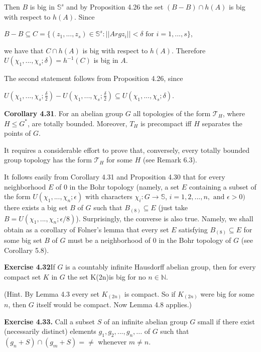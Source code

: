 \documentclass[12pt]{article}
\begin{document}
    Then $B$ is big in $\mathbb{S}^s$ and by Proposition 4.26 the set $(B - B) \cap h(A)$ is big with respect to $h(A)$. Since

        $B - B \subseteq C = \{(z_1, . . . , z_s) \in \mathbb{S}^s: ||Arg z_i|| < \delta \text{ for } i = 1, . . . , s\}$,

    we have that $C \cap h(A)$ is big with respect to $h(A)$. Therefore $U(\chi_1, . . . , \chi_s; \delta) = h^{-1}(C)$ is big in $A$.
        
    
    The second statement follows from Proposition 4.26, since

        $U(\chi_1, ..., \chi_s; \frac{\delta}{2}) - U(\chi_1, ..., \chi_s; \frac{\delta}{2}) \subseteq U(\chi_1, ..., \chi_s; \delta)$.


\textbf{Corollary 4.31}. For an abelian group $G$ all topologies of the form $\mathcal{T}_H$, where $H \leq G^*$, are totally bounded.
Moreover, $T_H$ is precompact iff $H$ separates the points of $G$.


    It requires a considerable effort to prove that, conversely, every totally bounded group topology has the form
$\mathcal{T}_H$ for some $H$ (see Remark 6.3).


    It follows easily from Corollary 4.31 and Proposition 4.30 that for every neighborhood $E$ of 0 in the Bohr
topology (namely, a set $E$ containing a subset of the form $U(\chi_1, . . . , \chi_n; \epsilon)$ with characters $\chi_i: G \to \mathbb{S}$,
$i = 1, 2, . . . , n, \text{ and } \epsilon > 0)$ there exists a big set $B$ of $G$ such that $B_{(8)} \subseteq E$ (just take $B = U(\chi_1, . . . , \chi_n; \epsilon/8)$).
Surprisingly, the converse is also true. Namely, we shall obtain as a corollary of Folner's lemma that every set
$E$ satisfying $B_{(8)} \subseteq E$ for some big set $B$ of $G$ must be a neighborhood of 0 in the Bohr topology of $G$ (see
Corollary 5.8).


\textbf{Exercise 4.32}If $G$ is a countably infinite Hausdorff abelian group, then for every compact set $K$ in $G$ the set
K(2n)is big for no $n \in \mathbb{N}$.


    (Hint. By Lemma 4.3 every set $K_{(2n)}$ is compact. So if $K_{(2n)}$ were big for some $n$, then $G$ itself would be
compact. Now Lemma 4.8 applies.)


\textbf{Exercise 4.33.} Call a subset $S$ of an infinite abelian group $G$ small if there exist (necessarily distinct) elements
$g_1, g_2, . . . , g_n, . . .$ of $G$ such that $(g_n + S) \cap (g_m + S) = \neq$ whenever $m \neq n$.
\end{document}
